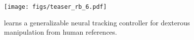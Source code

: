 \begin{figure}[htbp]
  \texttt{[image: figs/teaser\_rb\_6.pdf]}
  \vspace{-23pt}
  \caption{ \footnotesize
 \href{https://projectwebsite7.github.io/gene-dex-manip/}{\modelname} learns a generalizable neural tracking controller for dexterous manipulation from human references. 
}
\end{figure}
